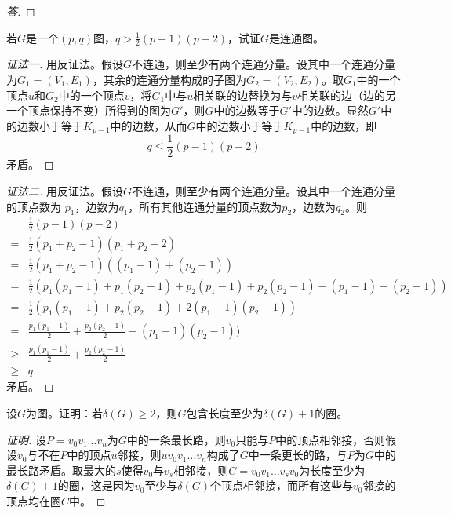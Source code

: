 \documentclass{article}
\begin{document}
\begin{CJK}{UTF8}{gbsn}
\begin{proof}[答]
\end{proof}
\begin{Exercise}
若$G$是一个$(p,q)$图，$q > \frac{1}{2}(p-1)(p-2)$，试证$G$是连通图。  
\end{Exercise}
\begin{proof}[证法一]
  用反证法。假设$G$不连通，则至少有两个连通分量。设其中一个连通分量为$G_1=(V_1,E_1)$，其余的连通分量构成的子图为$G_2=(V_2,E_2)$。取$G_1$中的一个顶点$u$和$G_2$中的一个顶点$v$，将$G_1$中与$u$相关联的边替换为与$v$相关联的边（边的另一个顶点保持不变）所得到的图为$G'$，则$G$中的边数等于$G'$中的边数。显然$G'$中的边数小于等于$K_{p-1}$中的边数，从而$G$中的边数小于等于$K_{p-1}$中的边数，即
   \[q\leq \frac{1}{2}(p-1)(p-2)\]
   矛盾。    
   \end{proof}
\begin{proof}[证法二]
  用反证法。假设$G$不连通，则至少有两个连通分量。设其中一个连通分量的顶点数为
  $p_1$，边数为$q_1$，所有其他连通分量的顶点数为$p_2$，边数为$q_2$。则
  \begin{equation*}
    \begin{split}
      &\frac{1}{2}(p-1)(p-2)\\
      =&\frac{1}{2}(p_1 + p_2 -1)(p_1 + p_2 -2)\\
      =&\frac{1}{2}(p_1 + p_2 -1)((p_1 - 1) + (p_2 - 1))\\
      =&\frac{1}{2}(p_1(p_1 -1) +  p_1(p_2 - 1) + p_2(p_1 - 1) + p_2(p_2-1) - (p_1 - 1) - (p_2-1))\\
      =&\frac{1}{2}(p_1(p_1 -1) +   p_2(p_2-1) + 2(p_1 - 1)(p_2-1))\\
      =&\frac{p_1(p_1 -1)}{2} +   \frac{p_2(p_2-1)}{2} + (p_1 - 1)(p_2-1))\\
      \geq&\frac{p_1(p_1 -1)}{2} +   \frac{p_2(p_2-1)}{2}\\
      \geq & q
    \end{split}
  \end{equation*}
  矛盾。
\end{proof}
\begin{Exercise}
设$G$为图。证明：若$\delta(G)\geq 2$，则$G$包含长度至少为$\delta(G)+1$的圈。  
\end{Exercise}
\begin{proof}[证明]
  设$P=v_0v_1\ldots v_n$为$G$中的一条最长路，则$v_0$只能与$P$中的顶点相邻接，否则假设$v_0$与不在$P$中的顶点$u$邻接，则$uv_0v_1\ldots v_n$构成了$G$中一条更长的路，与$P$为$G$中的最长路矛盾。取最大的$s$使得$v_0$与$v_s$相邻接，则$C=v_0v_1\ldots v_sv_0$为长度至少为$\delta(G)+1$的圈，这是因为$v_0$至少与$\delta(G)$个顶点相邻接，而所有这些与$v_0$邻接的顶点均在圈$C$中。
\end{proof}



\end{CJK}
\end{document}
